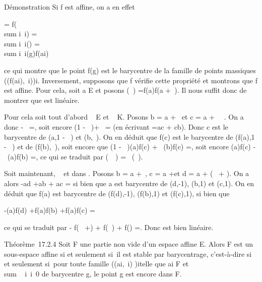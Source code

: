 Démonstration Si f est affine, on a en effet

 =\vec
f(\\sum
i\inI\lambda~i\overrightarrowgai)
= \\sum
i\inI\lambda~i\vecf(\overrightarrowgai)
= \\sum
i\inI\lambda~i\overrightarrowf(g)f(ai)

ce qui montre que le point f(g) est le barycentre de la famille de
points massiques \left
((f(ai),\lambda~i)\right )i\inI.
Inversement, supposons que f vérifie cette propriété et montrons que f
est affine. Pour cela, soit a \in E et posons
\vecf(\overrightarrow\xi~)
=\overrightarrow f(a)f(a
+\overrightarrow \xi~). Il nous suffit donc de montrer
que \vecf est linéaire.

Pour cela soit tout d'abord \overrightarrow\xi~
\in\overrightarrow E et \lambda~ \in K. Posons b = a
+\overrightarrow \xi~ et c = a +
\lambda~\overrightarrow\xi~. On a donc
\overrightarrowac -
\lambda~\overrightarrowab =, soit encore (1 - \lambda~)\overrightarrowac +
\lambda~\overrightarrowbc = (en écrivant \overrightarrowab
=\overrightarrow ac +\overrightarrow
cb). Donc c est le barycentre de (a,1 - \lambda~) et (b,\lambda~). On en déduit que
f(c) est le barycentre de (f(a),1 - \lambda~) et de (f(b),\lambda~), soit encore que
(1 - \lambda~)\overrightarrowf(a)f(c) +
\lambda~\overrightarrowf(b)f(c)
=, soit encore
\overrightarrowf(a)f(c) -
\lambda~\overrightarrowf(a)f(b)
=, ce qui se traduit par
\vecf(\lambda~\overrightarrow\xi~) =
\lambda~\vecf(\overrightarrow\xi~).

Soit maintenant, \overrightarrow\xi~ et
\overrightarrow\eta dans
\overrightarrowE. Posons b = a
+\overrightarrow \xi~, c = a
+\overrightarrow \eta et d = a +
(\overrightarrow\xi~ +\overrightarrow
\eta). On a alors -\overrightarrow ad
+\overrightarrow ab +\overrightarrow
ac = si bien que a est barycentre
de (d,-1), (b,1) et (c,1). On en déduit que f(a) est barycentre de
(f(d),-1), (f(b),1) et (f(c),1), si bien que

-\overrightarrowf(a)f(d)
+\overrightarrow f(a)f(b)
+\overrightarrow f(a)f(c)
=

ce qui se traduit par -\vec
f(\overrightarrow\xi~
+\overrightarrow \eta) +\vec
f(\overrightarrow\xi~) +\vec
f(\overrightarrow\eta)
=. Donc \vecf est
bien linéaire.

Théorème~17.2.4 Soit F une partie non vide d'un espace affine E. Alors F
est un sous-espace affine si et seulement si~il est stable par
barycentrage, c'est-à-dire si et seulement si~pour toute famille
\left ((ai,\lambda~i)\right
)i\inI telle que ai \in F et
\\sum ~
i\inI\lambda~i\neq~0 de barycentre g, le
point g est encore dans F.

